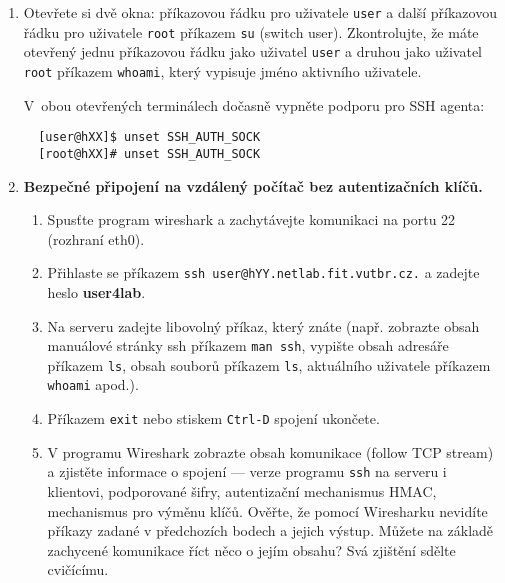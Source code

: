 \documentclass[a4paper,11pt]{article}
\begin{document}
\begin{enumerate}

  \item Otevřete si dvě okna: příkazovou řádku pro uživatele {\tt user} a další
    příkazovou řádku pro uživatele {\tt root} příkazem {\tt su} (switch user).
Zkontrolujte, že máte otevřený jednu příkazovou řádku jako uživatel
{\tt user} a druhou jako uživatel {\tt root} příkazem {\tt whoami}, který vypisuje jméno aktivního
uživatele.

    V~obou otevřených terminálech dočasně vypněte podporu pro SSH agenta:
  \begin{lstlisting}
  [user@hXX]$ unset SSH_AUTH_SOCK
  [root@hXX]# unset SSH_AUTH_SOCK
  \end{lstlisting}

  \item {\bf Bezpečné připojení na vzdálený počítač bez autentizačních klíčů.}

    \begin{enumerate}

      \item Spusťte program wireshark a zachytávejte komunikaci na portu 22
        (rozhraní eth0).

      \item Přihlaste se příkazem {\tt ssh user@hYY.netlab.fit.vutbr.cz.} a zadejte heslo \textbf{user4lab}.

      \item Na serveru zadejte libovolný příkaz, který znáte (např. zobrazte
        obsah manuálové stránky ssh příkazem {\tt man ssh}, vypište
        obsah adresáře příkazem {\tt ls}, obsah souborů příkazem {\tt ls},
        aktuálního uživatele příkazem {\tt whoami} apod.).

      \item Příkazem {\tt exit} nebo stiskem {\tt Ctrl-D} spojení ukončete.

      \item V programu Wireshark zobrazte obsah komunikace (follow TCP stream) a
        zjistěte informace o spojení --- verze programu {\tt ssh} na serveru i
        klientovi, podporované šifry, autentizační mechanismus HMAC, mechanismus
        pro výměnu klíčů. Ověřte, že pomocí Wiresharku nevidíte příkazy zadané v
        předchozích bodech a jejich výstup. Můžete na základě zachycené
        komunikace říct něco o jejím obsahu? Svá zjištění sdělte cvičícímu.

    \end{enumerate}


\end{enumerate}
\end{document}
